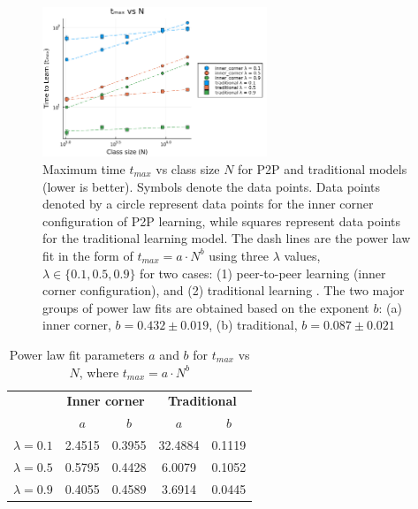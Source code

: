 \documentclass[10pt,a4paper,twoside]{article}
\begin{document}
\begin{figure}[h]
  \centering
  \includegraphics[width=0.6\textwidth]{figures/N_vs_tmax-traditional-inner_corner.png}
  \caption{Maximum time $t_{max}$ vs class size $N$ for P2P and traditional models (lower is better). Symbols denote the data points. Data points denoted by a circle represent data points for the inner corner configuration of P2P learning, while squares represent data points for the traditional learning model. The dash lines are the power law fit in the form of $t_{max}=a \cdot N^b$ using three $\lambda$ values, $\lambda \in \lbrace 0.1, 0.5, 0.9 \rbrace$ for two cases: (1) peer-to-peer learning (inner corner configuration), and (2) traditional learning . The two major groups of power law fits are obtained based on the exponent $b$: (a) inner corner, $b = 0.432 \pm 0.019$, (b) traditional, $b=0.087\pm0.021$
  }
  \label{fig:tmax vs N}
\end{figure}

\begin{table}[h]
  \centering
  
  \begin{tabular}{|c|cc|cc|}
    \hline
    & \multicolumn{2}{c|}{\textbf{Inner corner}}       & \multicolumn{2}{c|}{\textbf{Traditional}}        \\ \cline{2-5} 
    & \multicolumn{1}{c|}{\textbf{$a$}} & \textbf{$b$} & \multicolumn{1}{c|}{\textbf{$a$}} & \textbf{$b$} \\ \hline
    \textbf{$\lambda=0.1$} & \multicolumn{1}{c|}{2.4515}       & 0.3955       & \multicolumn{1}{c|}{32.4884}      & 0.1119       \\ \hline
    \textbf{$\lambda=0.5$} & \multicolumn{1}{c|}{0.5795}       & 0.4428       & \multicolumn{1}{c|}{6.0079}       & 0.1052       \\ \hline
    \textbf{$\lambda=0.9$} & \multicolumn{1}{c|}{0.4055}       & 0.4589       & \multicolumn{1}{c|}{3.6914}       & 0.0445       \\ \hline
  \end{tabular}
  \caption{Power law fit parameters $a$ and $b$ for $t_{max}$ vs $N$, where $t_{max}=a \cdot N ^ b$}
  \label{tab:tmax vs N fit params}
\end{table}
\end{document}
